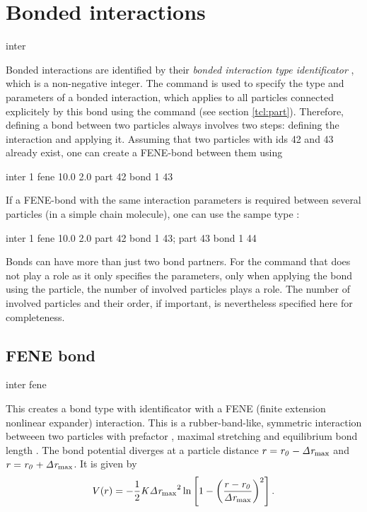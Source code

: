 \section{Bonded interactions}
\label{sec:inter-bonded}

\begin{essyntax*}
  inter 
\end{essyntax*}

 Bonded interactions are identified
by their \emph{bonded interaction type identificator} ,
which is a non-negative integer.  The   command
is used to specify the type and parameters of a bonded interaction,
which applies to all particles connected explicitely by this bond
using the  command (see section \vref{tcl:part}).
Therefore, defining a bond between two particles always involves two
steps: defining the interaction and applying it. Assuming that two
particles with ids 42 and 43 already exist, one can create \eg a
FENE-bond between them using
\begin{tclcode}
  inter 1 fene 10.0 2.0
  part 42 bond 1 43
\end{tclcode}
If a FENE-bond with the same interaction parameters is required between several
particles (\eg in a simple chain molecule), one can use the sampe type :
\begin{tclcode}
  inter 1 fene 10.0 2.0
  part 42 bond 1 43; part 43 bond 1 44 
\end{tclcode}

Bonds can have more than just two bond partners. For the  command
that does not play a role as it only specifies the parameters, only when
applying the bond using the  particle, the number of involved
particles plays a role. The number of involved particles and their order, if
important, is nevertheless specified here for completeness.

\subsection{FENE bond}

\begin{essyntax}
  inter 
  fene
    
\end{essyntax}
This creates a bond type with identificator  with a
FENE (finite extension nonlinear expander) interaction. This is a
rubber-band-like, symmetric interaction betweeen two particles with
prefactor , maximal stretching  and
equilibrium bond length .  The bond potential diverges at a
particle distance $r=\mathrm{\mathit{r_0}}-\mathrm{\mathit{\Delta r_\mathrm{max}}}$ and
$r=\mathrm{\mathit{r_0}}+\mathrm{\mathit{\Delta r_\mathrm{max}}}$. It is given by
\begin{equation}
  V(r) = -\frac{1}{2} \mathrm{\mathit{K}} \mathrm{\mathit{\Delta r_\mathrm{max}}}^2\ln \left[ 1 - \left(
      \frac{r-\mathrm{\mathit{r_0}}}{\mathrm{\mathit{\Delta r_\mathrm{max}}}} \right)^2 \right].
\end{equation}

